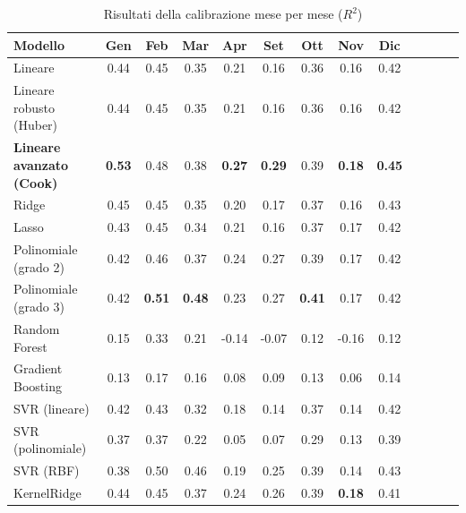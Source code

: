 \begin{table}[H]
    \footnotesize
    \centering
    \def\arraystretch{0.95}
    \begin{tabular}{|l|c|c|c|c|c|c|c|c|c|c|c|c|}
    \hline
        \textbf{Modello} & \textbf{Gen} & \textbf{Feb} & \textbf{Mar} & \textbf{Apr} & \textbf{Set} & \textbf{Ott} & \textbf{Nov} & \textbf{Dic} \\ \hline
        Lineare & 0.44 & 0.45 & 0.35 & 0.21 & 0.16 & 0.36 & 0.16 & 0.42 \\ \hline
        Lineare robusto (Huber) & 0.44 & 0.45 & 0.35 & 0.21 & 0.16 & 0.36 & 0.16 & 0.42 \\ \hline
        \textbf{Lineare avanzato (Cook)} & \textbf{0.53} & 0.48 & 0.38 & \textbf{0.27} & \textbf{0.29} & 0.39 & \textbf{0.18} & \textbf{0.45} \\ \hline
        Ridge & 0.45 & 0.45 & 0.35 & 0.20 & 0.17 & 0.37 & 0.16 & 0.43 \\ \hline
        Lasso & 0.43 & 0.45 & 0.34 & 0.21 & 0.16 & 0.37 & 0.17 & 0.42 \\ \hline
        Polinomiale (grado 2) & 0.42 & 0.46 & 0.37 & 0.24 & 0.27 & 0.39 & 0.17 & 0.42 \\ \hline
        Polinomiale (grado 3) & 0.42 & \textbf{0.51} & \textbf{0.48} & 0.23 & 0.27 & \textbf{0.41} & 0.17 & 0.42 \\ \hline
        Random Forest & 0.15 & 0.33 & 0.21 & -0.14 & -0.07 & 0.12 & -0.16 & 0.12 \\ \hline
        Gradient Boosting & 0.13 & 0.17 & 0.16 & 0.08 & 0.09 & 0.13 & 0.06 & 0.14 \\ \hline
        SVR (lineare) & 0.42 & 0.43 & 0.32 & 0.18 & 0.14 & 0.37 & 0.14 & 0.42 \\ \hline
        SVR (polinomiale) & 0.37 & 0.37 & 0.22 & 0.05 & 0.07 & 0.29 & 0.13 & 0.39 \\ \hline
        SVR (RBF) & 0.38 & 0.50 & 0.46 & 0.19 & 0.25 & 0.39 & 0.14 & 0.43 \\ \hline
        KernelRidge & 0.44 & 0.45 & 0.37 & 0.24 & 0.26 & 0.39 & \textbf{0.18} & 0.41 \\ \hline
    \end{tabular}
    \caption{Risultati della calibrazione  mese per mese ($R^2$)}
    \label{fig:risultati-no2-mese}
\end{table}

